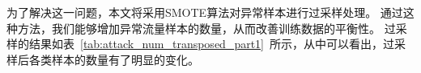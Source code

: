 为了解决这一问题，本文将采用SMOTE算法对异常样本进行过采样处理。
通过这种方法，我们能够增加异常流量样本的数量，从而改善训练数据的平衡性。
过采样的结果如表~\ref{tab:attack_num_transposed_part1}~所示，从中可以看出，过采样后各类样本的数量有了明显的变化。



